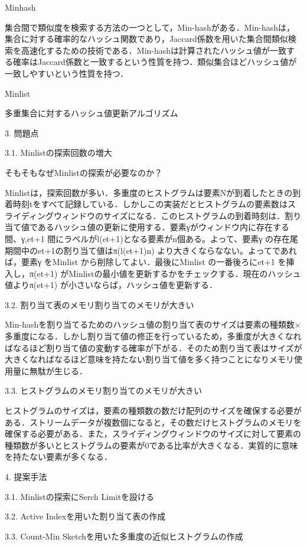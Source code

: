 Minhash

集合間で類似度を検索する方法の一つとして，Min-hashがある．Min-hashは，集合に対する確率的なハッシュ関数であり，Jaccard係数を用いた集合間類似検索を高速化するための技術である．Min-hashは計算されたハッシュ値が一致する確率はJaccard係数と一致するという性質を持つ．類似集合ほどハッシュ値が一致しやすいという性質を持つ．


Minlist

多重集合に対するハッシュ値更新アルゴリズム

3. 問題点

3.1. Minlistの探索回数の増大

そもそもなぜMinlistの探索が必要なのか？

Minlistは，探索回数が多い．多重度のヒストグラムは要素Nが到着したときの到着時刻tをすべて記録している．しかしこの実装だとヒストグラムの要素数はスライディングウィンドウのサイズになる．このヒストグラムの到着時刻は．割り当て値であるハッシュ値の更新に使用する．要素γがウィンドウ内に存在する間、γ,et+1 間にラベルがl(et+1)となる要素がn個ある。よって、要素γ の存在尾期間中のet+1の割り当て値はπ(l(et+1)n) より大きくならなない。よってであれば，要素γ をMinlist から削除してよい．最後にMinlist の一番後ろにet+1 を挿入し，π(et+1) がMinlistの最小値を更新するかをチェックする．現在のハッシュ値よりπ(et+1) が小さいならば，ハッシュ値を更新する．

3.2. 割り当て表のメモリ割り当てのメモリが大きい

Min-hashを割り当てるためのハッシュ値の割り当て表のサイズは要素の種類数×多重度になる．しかし割り当て値の修正を行っているため，多重度が大きくなればなるほど割り当て値の変動する確率が下がる．そのため割り当て表はサイズが大きくなればなるほど意味を持たない割り当て値を多く持つことになりメモリ使用量に無駄が生じる．

3.3. ヒストグラムのメモリ割り当てのメモリが大きい

ヒストグラムのサイズは，要素の種類数の数だけ配列のサイズを確保する必要がある．ストリームデータが複数個になると，その数だけヒストグラムのメモリを確保する必要がある．また，スライディングウィンドウのサイズに対して要素の種類数が多いとヒストグラムの要素が0である比率が大きくなる．実質的に意味を持たない要素が多くなる．

4. 提案手法

3.1. Minlistの探索にSerch Limitを設ける



3.2. Active Indexを用いた割り当て表の作成

3.3. Count-Min Sketchを用いた多重度の近似ヒストグラムの作成